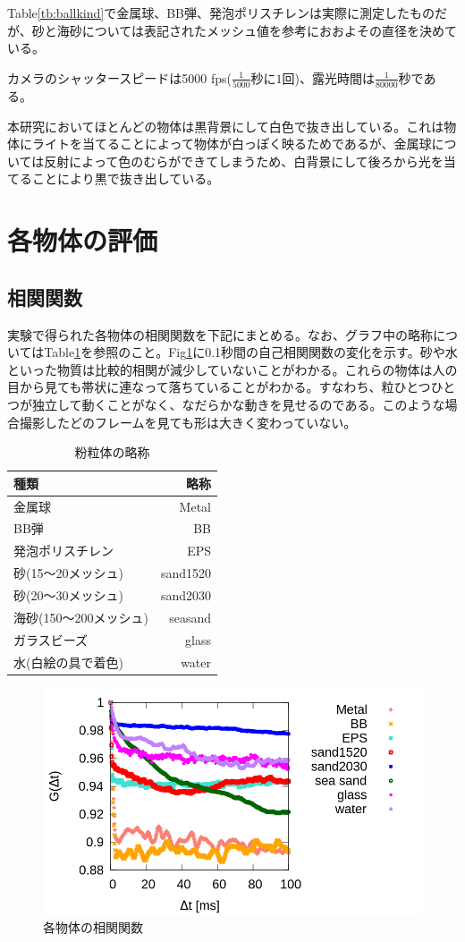 \documentclass[a4paper,10pt,twocolumn,dvipdfmx]{jsarticle}
\begin{document}
Table\ref{tb:ballkind}で金属球、BB弾、発泡ポリスチレンは実際に測定したものだが、砂と海砂については表記されたメッシュ値を参考におおよその直径を決めている。 \par
カメラのシャッタースピードは5000 fps($\frac{1}{5000}秒に1回$)、露光時間は$\frac{1}{80000}秒$である。 \par
本研究においてほとんどの物体は黒背景にして白色で抜き出している。これは物体にライトを当てることによって物体が白っぽく映るためであるが、金属球については反射によって色のむらができてしまうため、白背景にして後ろから光を当てることにより黒で抜き出している。

\section{各物体の評価}
\subsection{相関関数}
実験で得られた各物体の相関関数を下記にまとめる。なお、グラフ中の略称についてはTable\ref{tb:ballname}を参照のこと。Fig\ref{fig:overall}に0.1秒間の自己相関関数の変化を示す。砂や水といった物質は比較的相関が減少していないことがわかる。これらの物体は人の目から見ても帯状に連なって落ちていることがわかる。すなわち、粒ひとつひとつが独立して動くことがなく、なだらかな動きを見せるのである。このような場合撮影したどのフレームを見ても形は大きく変わっていない。 \par
\begin{table}[H]
	\caption{粉粒体の略称 \label{tb:ballname}}
	\begin{tabular}{lr}
		\toprule
		種類 & 略称 \\
		\midrule
		金属球 & Metal \\
		BB弾 & BB \\
		発泡ポリスチレン & EPS \\
		砂(15〜20メッシュ) & sand1520 \\
		砂(20〜30メッシュ) & sand2030 \\
		海砂(150〜200メッシュ) & seasand \\
		ガラスビーズ & glass \\
		水(白絵の具で着色) & water \\
		\bottomrule
	\end{tabular}
\end{table}
\begin{figure}[H]
	\includegraphics[scale=0.4]{multi.png}
	\caption{各物体の相関関数}
	\label{fig:overall}
\end{figure}
\end{document}
